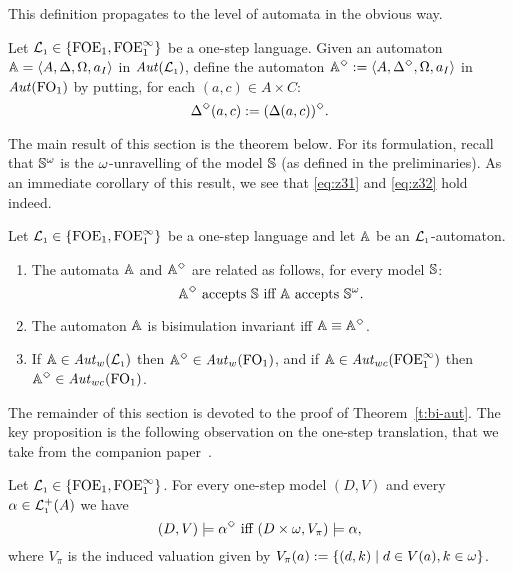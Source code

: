 \noindent
This definition propagates to the level of automata in the obvious way.

\begin{definition}
Let $\mathcal{L}_{\scriptscriptstyle 1}\in \{{\mathrm{FOE}_1},{\mathrm{FOE}^{\infty}_1}\}$ be a one-step language.
Given an automaton $\mathbb{A} = \langle{A,\Delta,\Omega,a_{I}}\rangle$ in $\mathit{Aut}(\mathcal{L}_{\scriptscriptstyle 1})$, define 
the automaton $\mathbb{A}^{\Diamond} \mathrel{: =} \langle{A,\Delta^{\Diamond},\Omega,a_{I}}\rangle$ in 
$\mathit{Aut}(\mathrm{FO}_1)$ by putting, for each $(a,c) \in A \times C$:
\[
\Delta^{\Diamond}(a,c) \mathrel{: =} (\Delta(a,c))^{\Diamond}.
\]
\end{definition}

The main result of this section is the theorem below.
For its formulation, recall that $\mathbb{S}^{\omega}$ is the $\omega$-unravelling of 
the model $\mathbb{S}$ (as defined in the preliminaries).
As an immediate corollary of this result, we see that \eqref{eq:z31} and
\eqref{eq:z32} hold indeed.

\begin{theorem}
\label{t:bi-aut}
Let $\mathcal{L}_{\scriptscriptstyle 1}\in \{{\mathrm{FOE}_1},{\mathrm{FOE}^{\infty}_1}\}$ be a one-step language and let $\mathbb{A}$ be an
$\mathcal{L}_{\scriptscriptstyle 1}$-automaton.

\begin{enumerate}
\item
The automata $\mathbb{A}$ and $\mathbb{A}^{\Diamond}$ are related as follows, for every model $\mathbb{S}$:
\begin{equation}
\label{eq:crux}
\bbA^{\tmod} \text{ accepts } \bbS \text{ iff } \bbA \text{ accepts
} \bbS^{\om}.
\end{equation}
\item
The automaton $\mathbb{A}$ is bisimulation invariant iff $\mathbb{A} \equiv \mathbb{A}^{\Diamond}$.
\item
If $\mathbb{A}\in \mathit{Aut}_{w}(\mathcal{L}_{\scriptscriptstyle 1})$ then $\mathbb{A}^{\Diamond}\in \mathit{Aut}_{w}(\mathrm{FO}_1)$, and 
if $\mathbb{A}\in \mathit{Aut}_{wc}(\mathrm{FOE}^{\infty}_1)$ then $\mathbb{A}^{\Diamond}\in \mathit{Aut}_{wc}(\mathrm{FO}_1)$.
\end{enumerate}
\end{theorem}


The remainder of this section is devoted to the proof of 
Theorem~\ref{t:bi-aut}.
The key proposition is the following observation on the one-step translation,
that we take from the companion paper~\cite{xxxxxx}.

\begin{proposition}
\label{p-1P}
Let $\mathcal{L}_{\scriptscriptstyle 1}\in \{{\mathrm{FOE}_1},{\mathrm{FOE}^{\infty}_1}\}$.
For every one-step model $(D,V)$ and every $\alpha \in \mathcal{L}_{\scriptscriptstyle 1}^+(A)$ we have
\begin{equation}
\label{eq-1cr}
(D,V) \models \alpha^{\tmod} \text{ iff } (D\times \om,V_\pi) \models \alpha,
\end{equation}
where $V_{\pi}$ %
 is the induced valuation given by 
$V_{\pi}(a) \mathrel{: =} \{ (d,k) \mid d \in V(a), k\in\omega\}$.
\end{proposition}

